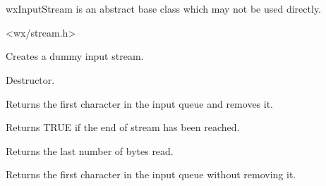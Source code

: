 \section{}\label{wxinputstream}

wxInputStream is an abstract base class which may not be used directly.




<wx/stream.h>




Creates a dummy input stream.



Destructor.



Returns the first character in the input queue and removes it.

\label{wxinputstreameof}


Returns TRUE if the end of stream has been reached.

\label{wxinputstreamlastread}


Returns the last number of bytes read.



Returns the first character in the input queue without removing it.



